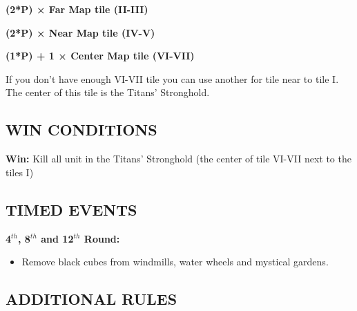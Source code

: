 \begin{multicols*}{2}
\textbf{(2*P) × Far Map tile (II-III)}

\textbf{(2*P) × Near Map tile (IV-V)}

\textbf{(1*P) + 1 × Center Map tile (VI-VII)}

If you don't have enough VI-VII tile you can use another for tile near to tile I.
The center of this tile is the Titans' Stronghold.

\columnbreak

\subsection*{\MakeUppercase{Win conditions}}

\textbf{Win:} Kill all unit in the Titans' Stronghold (the center of tile VI-VII next to the tiles I)

\subsection*{\MakeUppercase{Timed events}}

\textbf{4$^{th}$, 8$^{th}$ and 12$^{th}$ Round:}
\begin{itemize}
	\item Remove black cubes from windmills, water wheels and mystical gardens.
\end{itemize}

\end{multicols*}

\newpage

\subsection*{\MakeUppercase{Additional rules}}


